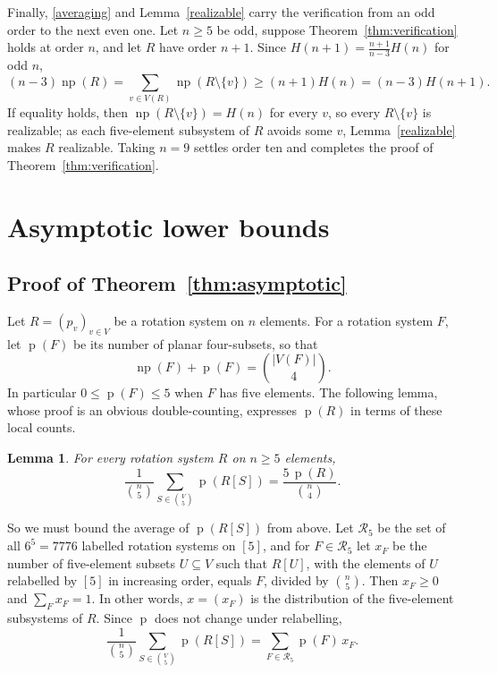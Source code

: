 \documentclass{article}
\theoremstyle{plain}
\newtheorem{lemma}[theorem]{Lemma}
\theoremstyle{definition}
\theoremstyle{remark}
\newcommand{\np}{\operatorname{np}}
\newcommand{\p}{\operatorname{p}}
\begin{document}
Finally, \eqref{averaging} and Lemma~\ref{realizable} carry the
verification from an odd order to the next even one.  Let \(n\geq 5\)
be odd, suppose Theorem~\ref{thm:verification} holds at order \(n\),
and let \(R\) have order \(n+1\).  Since
\(H(n+1)=\frac{n+1}{n-3}H(n)\) for odd \(n\),
\[
(n-3)\np(R)=\sum_{v\in V(R)}\np(R\setminus\{v\})
\geq (n+1)H(n)=(n-3)H(n+1).
\]
If equality holds, then \(\np(R\setminus\{v\})=H(n)\) for every
\(v\), so every \(R\setminus\{v\}\) is realizable; as each
five-element subsystem of \(R\) avoids some \(v\),
Lemma~\ref{realizable} makes \(R\) realizable.  Taking \(n=9\) settles
order ten and completes the proof of Theorem~\ref{thm:verification}.

\section{Asymptotic lower bounds}\label{sec:asymptotic}

\subsection{Proof of Theorem~\ref{thm:asymptotic}}\label{subsec:flag}

Let \(R=(p_v)_{v\in V}\) be a rotation system on \(n\) elements.  For
a rotation system \(F\), let \(\p(F)\) be its number of planar
four-subsets, so that
\begin{equation}\label{eq:np-plus-p}
\np(F)+\p(F)=\binom{|V(F)|}{4}.
\end{equation}
In particular \(0\leq \p(F)\leq5\) when \(F\) has five elements.  The following lemma, whose proof is an obvious double-counting, expresses \(\p(R)\) in terms of these local counts.

\begin{lemma}\label{lem:k5-average}
For every rotation system \(R\) on \(n\geq 5\) elements,
\begin{equation}\label{eq:k5-planar-average}
\frac{1}{\binom n5}\sum_{S\in\binom V5}\p(R[S])
=\frac{5\,\p(R)}{\binom n4}.
\end{equation}
\end{lemma}

So we must bound the average of \(\p(R[S])\) from above.  Let
\(\mathcal R_5\) be the set of all \(6^5=7776\) labelled rotation
systems on \([5]\), and for \(F\in\mathcal R_5\) let \(x_F\) be the
number of five-element subsets \(U\subseteq V\) such that \(R[U]\),
with the elements of \(U\) relabelled by \([5]\) in increasing order,
equals \(F\), divided by \(\binom n5\).  Then \(x_F\geq0\) and \(\sum_Fx_F=1\).  In
other words, \(x=(x_F)\) is the distribution of the five-element
subsystems of \(R\).  Since \(\p\) does not change under relabelling,
\begin{equation}\label{eq:target-linear}
\frac{1}{\binom n5}\sum_{S\in\binom V5}\p(R[S])
=\sum_{F\in\mathcal R_5}\p(F)\,x_F .
\end{equation}
\end{document}
